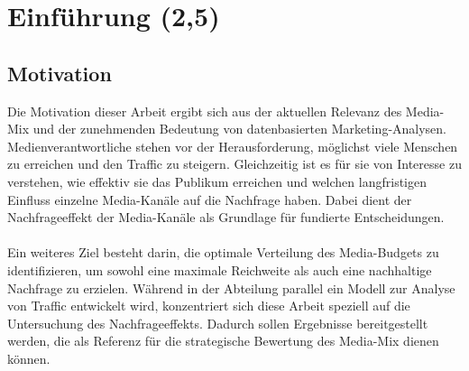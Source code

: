 
\newpage
\section{Einführung (2,5)}
\label{Einführung}
\subsection{Motivation}
Die Motivation dieser Arbeit ergibt sich aus der aktuellen Relevanz des Media-Mix und der zunehmenden Bedeutung von datenbasierten Marketing-Analysen. Medienverantwortliche stehen vor der Herausforderung, möglichst viele Menschen zu erreichen und den Traffic zu steigern. Gleichzeitig ist es für sie von Interesse zu verstehen, wie effektiv sie das Publikum erreichen und welchen langfristigen Einfluss einzelne Media-Kanäle auf die Nachfrage haben. Dabei dient der Nachfrageeffekt der Media-Kanäle als Grundlage für fundierte Entscheidungen.\\\\
Ein weiteres Ziel besteht darin, die optimale Verteilung des Media-Budgets zu identifizieren, um sowohl eine maximale Reichweite als auch eine nachhaltige Nachfrage zu erzielen. Während in der Abteilung parallel ein Modell zur Analyse von Traffic entwickelt wird, konzentriert sich diese Arbeit speziell auf die Untersuchung des Nachfrageeffekts. Dadurch sollen Ergebnisse bereitgestellt werden, die als Referenz für die strategische Bewertung des Media-Mix dienen können. \\
